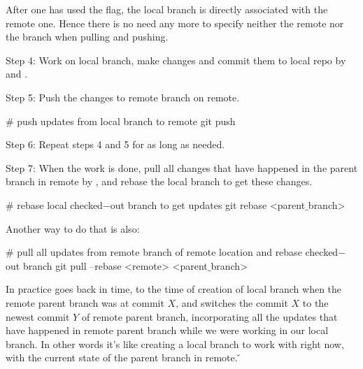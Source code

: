 After one has used the  flag, the local branch is directly associated with the remote one. Hence there is
no need any more to specify neither the remote nor the branch when pulling and pushing.
\item Step 4: Work on local branch, make changes and commit them to local repo by  and .
\item Step 5: Push the changes to remote branch on remote.

\begin{bash}
# push updates from local branch to remote
git push
\end{bash}

\item Step 6: Repeat steps 4 and 5 for as long as needed.
\item Step 7: When the work is done, pull all changes that have happened in the parent branch in remote by , and rebase the local branch to get these changes.

\begin{bash}
# rebase local checked$-$out branch to get updates
git rebase <parent$\_$branch>
\end{bash}

Another way to do that is also:

\begin{bash}
# pull all updates from remote branch of remote location and rebase checked$-$out branch
git pull --rebase <remote> <parent$\_$branch>
\end{bash}

In practice  goes back in time, to the time of creation of local branch when the remote parent
branch was at commit $X$, and switches the commit $X$ to the newest commit $Y$ of remote parent branch, incorporating
all the updates that have happened in remote parent branch while we were working in our local branch. In other words
it's like creating a local branch to work with right now, with the current state of the parent branch in remote. \v

